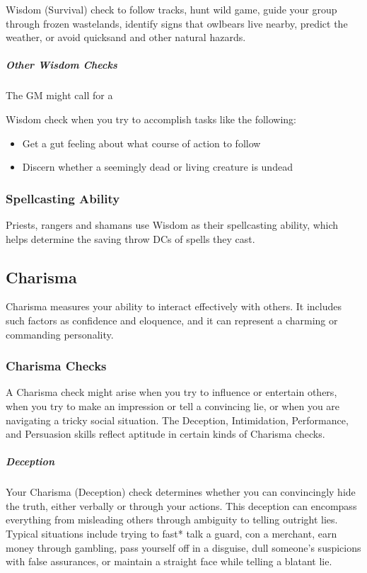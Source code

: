 Wisdom (Survival) check to follow tracks, hunt wild game, guide your group through frozen wastelands, identify signs that owlbears live nearby, predict the weather, or avoid quicksand and other natural hazards.

\subparagraph*{Other Wisdom Checks} The GM might call for a

Wisdom check when you try to accomplish tasks like the following:

\begin{itemize}
    \item Get a gut feeling about what course of action to follow
    \item Discern whether a seemingly dead or living creature is undead
\end{itemize}

\subsubsection{Spellcasting Ability}

Priests, rangers and shamans use Wisdom as their spellcasting ability, which helps determine the saving throw DCs of spells they cast.

\subsection{Charisma}

Charisma measures your ability to interact effectively with others. It includes such factors as confidence and eloquence, and it can represent a charming or commanding personality.

\subsubsection{Charisma Checks}

A Charisma check might arise when you try to influence or entertain others, when you try to make an impression or tell a convincing lie, or when you are navigating a tricky social situation. The Deception, Intimidation, Performance, and Persuasion skills reflect aptitude in certain kinds of Charisma checks.

\subparagraph*{Deception} Your Charisma (Deception) check determines whether you can convincingly hide the truth, either verbally or through your actions. This deception can encompass everything from misleading others through ambiguity to telling outright lies. Typical situations include trying to fast* talk a guard, con a merchant, earn money through gambling, pass yourself off in a disguise, dull someone's suspicions with false assurances, or maintain a straight face while telling a blatant lie.

